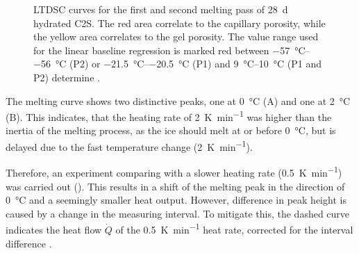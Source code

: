 \begin{figure}[!htb]

    \caption{
		\ac{LTDSC} curves for the first and second melting pass of \qty{28}{\day} hydrated \ac{C2S}.
		The red area correlate to the capillary porosity, while the yellow area correlates to the gel porosity.
		The value range used for the linear baseline regression is marked red between \qtyrange{-57}{-56}{\celsius} (P2) or \qtyrange{-21.5}{-20.5}{\celsius} (P1) and \qtyrange{9}{10}{\celsius} (P1 and P2) determine .
	}
    \label{fig:ltdsc_result_c2s_melt}
\end{figure}



The melting curve shows two distinctive peaks, one at \qty{0}{\celsius} (A) and one at \qty{2}{\celsius} (B).
This indicates, that the heating rate of \qty{2}{\kelvin\per\minute} was higher than the inertia of the melting process, as the ice should melt at or before \qty{0}{\celsius}, but is delayed due to the fast temperature change (\qty{2}{\kelvin\per\minute}).

Therefore, an experiment comparing with a slower heating rate (\qty{0.5}{\kelvin\per\minute}) was carried out ().
This results in a shift of the melting peak in the direction of \qty{0}{\celsius} and a seemingly smaller heat output.
However, difference in peak height is caused by a change in the measuring interval.
To mitigate this, the dashed curve indicates the heat flow $\dot{Q}$ of the \qty{0.5}{\kelvin\per\minute} heat rate, corrected for the interval difference . %

